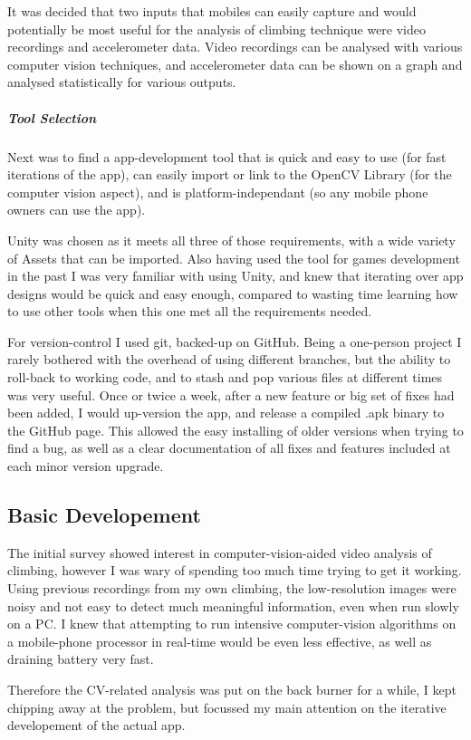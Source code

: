 It was decided that two inputs that mobiles can easily capture and would potentially be most useful for the analysis of climbing technique were video recordings and accelerometer data. Video recordings can be analysed with various computer vision techniques, and accelerometer data can be shown on a graph and analysed statistically for various outputs.

\subparagraph{Tool Selection}
Next was to find a app-development tool that is quick and easy to use (for fast iterations of the app), can easily import or link to the OpenCV Library (for the computer vision aspect), and is platform-independant (so any mobile phone owners can use the app).

Unity was chosen as it meets all three of those requirements, with a wide variety of Assets that can be imported.
Also having used the tool for games development in the past I was very familiar with using Unity, and knew that iterating over app designs would be quick and easy enough, compared to wasting time learning how to use other tools when this one met all the requirements needed.

For version-control I used git, backed-up on GitHub. Being a one-person project I rarely bothered with the overhead of using different branches, but the ability to roll-back to working code, and to stash and pop various files at different times was very useful.
Once or twice a week, after a new feature or big set of fixes had been added, I would up-version the app, and release a compiled .apk binary to the GitHub page.
This allowed the easy installing of older versions when trying to find a bug, as well as a clear documentation of all fixes and features included at each minor version upgrade.


\subsection{Basic Developement}
The initial survey showed interest in computer-vision-aided video analysis of climbing, however I was wary of spending too much time trying to get it working. Using previous recordings from my own climbing, the low-resolution images were noisy and not easy to detect much meaningful information, even when run slowly on a PC.
I knew that attempting to run intensive computer-vision algorithms on a mobile-phone processor in real-time would be even less effective, as well as draining battery very fast.


Therefore the CV-related analysis was put on the back burner for a while, I kept chipping away at the problem, but focussed my main attention on the iterative developement of the actual app.

